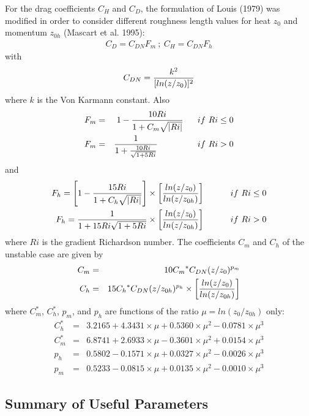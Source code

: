 For the drag coefficients $C_H$ and $C_D$, the formulation of
Louis (1979) was modified in order to consider different
roughness length values for heat $z_0$ and momentum $z_{0h}$
(Mascart et al. 1995):
\begin{eqnarray}
C_D = C_{DN} F_m \ ; \
C_H = C_{DN} F_h
\end{eqnarray}
with
\begin{eqnarray}
C_{DN} = {k^2 \over [ln ( z / z_0) ]^2} \\
\end{eqnarray}
where $k$ is the Von Karmann constant.  Also
\begin{eqnarray}
F_m &=& 1 - {10 Ri \over 1 + C_m
        \sqrt{|Ri|} }  \ \ \ \ \ if \ Ri \leq 0 \\
F_m &=& {1 \over 1 + {10Ri \over \sqrt{1+5Ri}}} \
        \ \ \ \ \ \ \ \ \ \ \ \ \ if \ Ri > 0
\end{eqnarray}
and
\begin{eqnarray}
F_h = \left[ 1-{15Ri \over 1 + C_h \sqrt{|Ri|}} \right]
      \times \left[ {ln(z/z_{0}) \over ln(z/z_{0h})} \right] \
      \ \ \ \ \ \ \ \ if \ Ri \leq 0 \\
F_h = {1 \over 1+15Ri \sqrt{1+5Ri}}
      \times \left[ {ln(z/z_{0}) \over ln(z/z_{0h})} \right] \
      \ \ \ \ \ \ \ \ if \ Ri > 0
\end{eqnarray}
where $Ri$ is the gradient Richardson number.
The coefficients $C_m$ and $C_h$ of the unstable case are given by
\begin{eqnarray}
C_m &=& 10 {C_m}^* C_{DN} (z/z_{0})^{p_m} \\
C_h &=& 15 {C_h}^* C_{DN} (z/z_{0h})^{p_h} \times
        \left[ {ln(z/z_{0}) \over ln(z/z_{0h})} \right]
\end{eqnarray}
where $C^*_m$, $C^*_h$, $p_m$, and $p_h$ are functions of the ratio
$\mu = ln(z_{0}/z_{0h})$ only:
\begin{eqnarray}
C^*_h &=& 3.2165 + 4.3431 \times \mu + 0.5360 \times \mu^2
        - 0.0781 \times \mu^3 \\
C^*_m &=& 6.8741 + 2.6933 \times \mu - 0.3601 \times \mu^2
        + 0.0154 \times \mu^3 \\
p_h &=& 0.5802 - 0.1571 \times \mu + 0.0327 \times \mu^2
        - 0.0026 \times \mu^3 \\
p_m &=& 0.5233 - 0.0815 \times \mu + 0.0135 \times \mu^2
        - 0.0010 \times \mu^3
\end{eqnarray}


\subsection{Summary of Useful Parameters}

